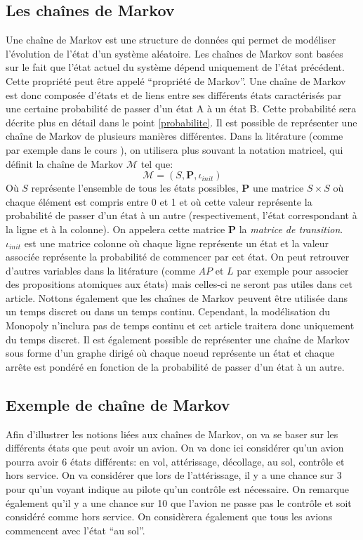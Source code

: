 \documentclass[letterpaper]{article}
\begin{document}
  \subsection{Les chaînes de Markov}
    \label{def_chaine_markov}
    Une chaîne de Markov est une structure de données qui permet de modéliser l'évolution
    de l'état d'un système aléatoire.  Les chaînes de Markov sont basées sur le 
    fait que l'état actuel du système dépend uniquement de l'état précédent.
    Cette propriété peut être appelé ``propriété de Markov''.  Une chaîne de
    Markov est donc composée d'états et de liens entre ses différents états caractérisés
    par une certaine probabilité de passer d'un état A à un état B.
    Cette probabilité sera décrite plus en détail dans le point \ref{probabilite}.
    Il est possible de représenter une chaîne de Markov de plusieurs manières différentes.
    Dans la litérature (comme par exemple dans le cours \citep{COURS}), on utilisera 
    plus souvant la notation matricel, qui définit la chaîne de Markov $\mathcal{M}$ 
    tel que:
    $$\mathcal{M} = (S, \mathbf{P}, \iota_{init})$$
    Où $S$ représente l'ensemble de tous les états possibles, $\mathbf{P}$ une matrice $S \times S$
    où chaque élément est compris entre 0 et 1 et où cette valeur représente la probabilité 
    de passer d'un état à un autre (respectivement, l'état correspondant à la ligne et à la colonne).
    On appelera cette matrice $\mathbf{P}$ la \textit{matrice de transition}.
    $\iota_{init}$ est une matrice colonne où chaque ligne représente un état et la valeur
    associée représente la probabilité de commencer par cet état.  On peut retrouver d'autres
    variables dans la litérature (comme $AP$ et $L$ par exemple pour associer des propositions 
    atomiques aux états) mais celles-ci ne seront pas utiles dans cet article.
    Nottons également que les chaînes de Markov peuvent être utilisée
    dans un temps discret ou dans un temps continu.  Cependant, la modélisation
    du Monopoly n'inclura pas de temps continu et cet article traitera donc uniquement
    du temps discret.
    Il est également possible de représenter une chaîne de Markov sous forme
    d'un graphe dirigé où chaque noeud représente un état et chaque arrête est pondéré
    en fonction de la probabilité de passer d'un état à un autre.
    
  \subsection{Exemple de chaîne de Markov}
    Afin d'illustrer les notions liées aux chaînes de Markov, on va se baser sur 
    les différents états que peut avoir un avion.  On va donc ici considérer 
    qu'un avion pourra avoir 6 états différents: en vol, attérissage, décollage, 
    au sol, contrôle et hors service.
    On va considérer que lors de l'attérissage, il y a une chance sur 3 pour qu'un
    voyant indique au pilote qu'un contrôle est nécessaire. On remarque également 
    qu'il y a une chance sur 10 que l'avion ne passe pas le contrôle et soit considéré 
    comme hors service.  On considèrera également que tous les avions commencent
    avec l'état ``au sol''.
    
\end{document}
